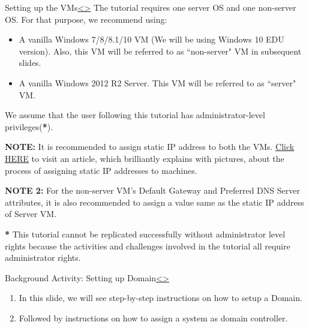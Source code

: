 \documentclass[12pt]{extarticle}
\newenvironment{instructionblock}{\Large\bgroup}{\egroup}
\begin{document}


\pagebreak
\begin{slide}{Setting up the VMs}{\hyperref[slide 10]{\textless}\hyperref[slide 12]{\textgreater}}
	\begin{instructionblock}
		The tutorial requires one server OS and one non-server OS. For that purpose, we recommend using:
		\begin{itemize}
			\item {A vanilla Windows 7/8/8.1/10 VM (We will be using Windows 10 EDU version). Also, this VM will be referred to as ``non-server" VM in subsequent slides. }
			\item {A vanilla Windows 2012 R2 Server. This VM will be referred to as ``server" VM. }
		\end{itemize}
		We assume that the user following this tutorial has administrator-level privileges(\textbf{*}).
	\end{instructionblock}
\end{slide}

\vspace{4mm}
\noindent
\textbf{NOTE:} It is recommended to assign static IP address to both the VMs. \href{http://www.howtogeek.com/howto/19249/how-to-assign-a-static-ip-address-in-xp-vista-or-windows-7/}{Click \underline{HERE}} \cite{staticIP} to visit an article, which brilliantly explains with pictures, about the process of assigning static IP addresses to machines. 

\vspace{4mm}
\noindent
\textbf{NOTE 2:} For the non-server VM's Default Gateway and Preferred DNS Server attributes, it is also recommended to assign a value same as the static IP address of Server VM.

\vspace{4mm}
\noindent
\textbf{*} This tutorial cannot be replicated successfully without administrator level rights because the activities and challenges involved in the tutorial all require administrator rights. 
 
 


\pagebreak
\begin{slide}{Background Activity: Setting up Domain}{\hyperref[slide 11]{\textless}\hyperref[slide 13]{\textgreater}}
	\begin{instructionblock}
		\begin{enumerate}
			\item In this slide, we will see step-by-step instructions on how to setup a Domain. 
			\item Followed by instructions on how to assign a system as domain controller.
		\end{enumerate}
	\end{instructionblock}
\end{slide}
\end{document}
